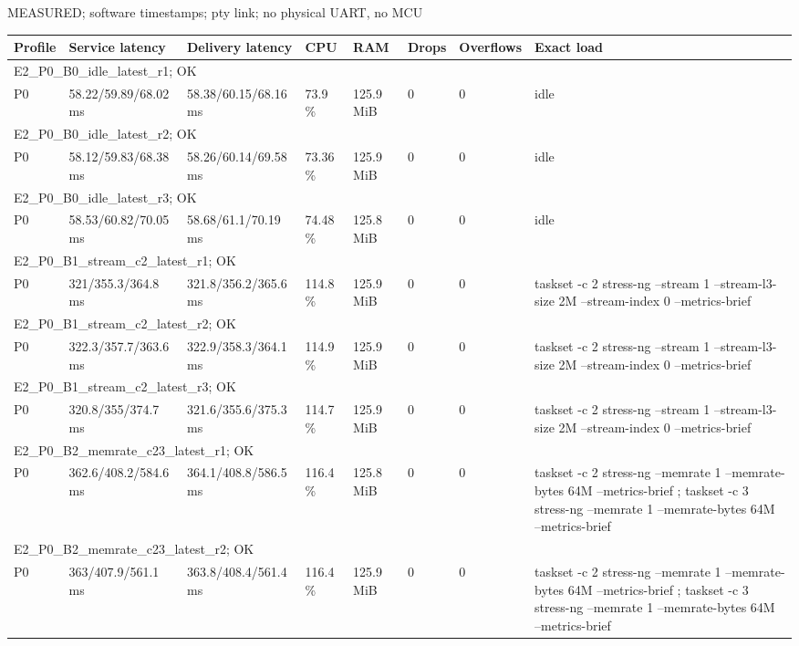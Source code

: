 \par\noindent MEASURED; software timestamps; pty link; no physical UART, no MCU\par
\begin{tabular}{llllllll}
\toprule
Profile & Service latency & Delivery latency & CPU & RAM & Drops & Overflows & Exact load \\
\midrule
\multicolumn{8}{l}{E2\_P0\_B0\_idle\_latest\_r1; OK} \\
P0 & 58.22/59.89/68.02 ms & 58.38/60.15/68.16 ms & 73.9 \% & 125.9 MiB & 0 & 0 & idle \\
\multicolumn{8}{l}{E2\_P0\_B0\_idle\_latest\_r2; OK} \\
P0 & 58.12/59.83/68.38 ms & 58.26/60.14/69.58 ms & 73.36 \% & 125.9 MiB & 0 & 0 & idle \\
\multicolumn{8}{l}{E2\_P0\_B0\_idle\_latest\_r3; OK} \\
P0 & 58.53/60.82/70.05 ms & 58.68/61.1/70.19 ms & 74.48 \% & 125.8 MiB & 0 & 0 & idle \\
\multicolumn{8}{l}{E2\_P0\_B1\_stream\_c2\_latest\_r1; OK} \\
P0 & 321/355.3/364.8 ms & 321.8/356.2/365.6 ms & 114.8 \% & 125.9 MiB & 0 & 0 & taskset -c 2 stress-ng --stream 1 --stream-l3-size 2M --stream-index 0 --metrics-brief \\
\multicolumn{8}{l}{E2\_P0\_B1\_stream\_c2\_latest\_r2; OK} \\
P0 & 322.3/357.7/363.6 ms & 322.9/358.3/364.1 ms & 114.9 \% & 125.9 MiB & 0 & 0 & taskset -c 2 stress-ng --stream 1 --stream-l3-size 2M --stream-index 0 --metrics-brief \\
\multicolumn{8}{l}{E2\_P0\_B1\_stream\_c2\_latest\_r3; OK} \\
P0 & 320.8/355/374.7 ms & 321.6/355.6/375.3 ms & 114.7 \% & 125.9 MiB & 0 & 0 & taskset -c 2 stress-ng --stream 1 --stream-l3-size 2M --stream-index 0 --metrics-brief \\
\multicolumn{8}{l}{E2\_P0\_B2\_memrate\_c23\_latest\_r1; OK} \\
P0 & 362.6/408.2/584.6 ms & 364.1/408.8/586.5 ms & 116.4 \% & 125.8 MiB & 0 & 0 & taskset -c 2 stress-ng --memrate 1 --memrate-bytes 64M --metrics-brief ; taskset -c 3 stress-ng --memrate 1 --memrate-bytes 64M --metrics-brief \\
\multicolumn{8}{l}{E2\_P0\_B2\_memrate\_c23\_latest\_r2; OK} \\
P0 & 363/407.9/561.1 ms & 363.8/408.4/561.4 ms & 116.4 \% & 125.9 MiB & 0 & 0 & taskset -c 2 stress-ng --memrate 1 --memrate-bytes 64M --metrics-brief ; taskset -c 3 stress-ng --memrate 1 --memrate-bytes 64M --metrics-brief \\

\end{tabular}
